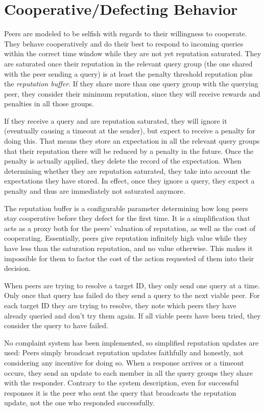 \section{Cooperative/Defecting Behavior}
\label{sec:impl_coop_defect_behavior}
Peers are modeled to be selfish with regards to their willingness to cooperate.
They behave cooperatively and do their best to respond to incoming queries
within the correct time window while they are not yet reputation saturated.
They are saturated once their reputation in the relevant query group (the one
shared with the peer sending a query) is at least the penalty threshold
reputation plus the \emph{reputation buffer}. If they share more than one query
group with the querying peer, they consider their minimum reputation, since they
will receive rewards and penalties in all those groups.

If they receive a query and are reputation saturated, they will ignore it
(eventually causing a timeout at the sender), but expect to receive a penalty
for doing this. That means they store an expectation in all the relevant query
groups that their reputation there will be reduced by a penalty in the future.
Once the penalty is actually applied, they delete the record of the expectation.
When determining whether they are reputation saturated, they take into account
the expectations they have stored. In effect, once they ignore a query, they
expect a penalty and thus are immediately not saturated anymore.

The reputation buffer is a configurable parameter determining how long peers
stay cooperative before they defect for the first time. It is a simplification
that acts as a proxy both for the peers' valuation of reputation, as well as the
cost of cooperating. Essentially, peers give reputation infinitely high value
while they have less than the saturation reputation, and no value otherwise.
This makes it impossible for them to factor the cost of the action requested of
them into their decision.

When peers are trying to resolve a target ID, they only send one query at a
time. Only once that query has failed do they send a query to the next viable
peer. For each target ID they are trying to resolve, they note which peers they
have already queried and don't try them again. If all viable peers have been
tried, they consider the query to have failed.

No complaint system has been implemented, so simplified reputation updates are
used: Peers simply broadcast reputation updates faithfully and honestly, not
considering any incentive for doing so. When a response arrives or a timeout
occurs, they send an update to each member in all the query groups they share
with the responder. Contrary to the system description, even for successful
responses it is the peer who sent the query that broadcasts the reputation
update, not the one who responded successfully.


